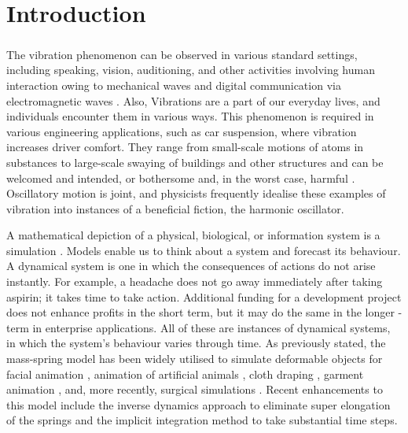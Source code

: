 \chapter{Introduction}
\label{chap:01}


\paragraph{}
The vibration phenomenon can be observed in various standard settings, including speaking, vision, auditioning, and other activities involving human interaction owing to mechanical waves and digital communication via electromagnetic waves \cite{tse1963mechanical}. Also, Vibrations are a part of our everyday lives, and individuals encounter them in various ways. This phenomenon is required in various engineering applications, such as car suspension, where vibration increases driver comfort. They range from small-scale motions of atoms in substances to large-scale swaying of buildings and other structures and can be welcomed and intended, or bothersome and, in the worst case, harmful \cite{mori2017mechanical}. Oscillatory motion is joint, and physicists frequently idealise these examples of vibration into instances of a beneficial fiction, the harmonic oscillator. 

A mathematical depiction of a physical, biological, or information system is a simulation \cite{wada1972equivalent}. Models enable us to think about a system and forecast its behaviour. A dynamical system is one in which the consequences of actions do not arise instantly. For example, a headache does not go away immediately after taking aspirin; it takes time to take action. Additional funding for a development project does not enhance profits in the short term, but it may do the same in the longer - term in enterprise applications. All of these are instances of dynamical systems, in which the system's behaviour varies through time. As previously stated, the mass-spring model has been widely utilised to simulate deformable objects for facial animation \cite{keeve1998deformable}, animation of artificial animals \cite{tu1994artificial}, cloth draping \cite{ji2006three}, garment animation \cite{provot1995deformation}, and, more recently, surgical simulations \cite{sorensen2007virtual}. Recent enhancements to this model include the inverse dynamics approach to eliminate super elongation of the springs \cite{mozafary2016study} and the implicit integration method to take substantial time steps. 


